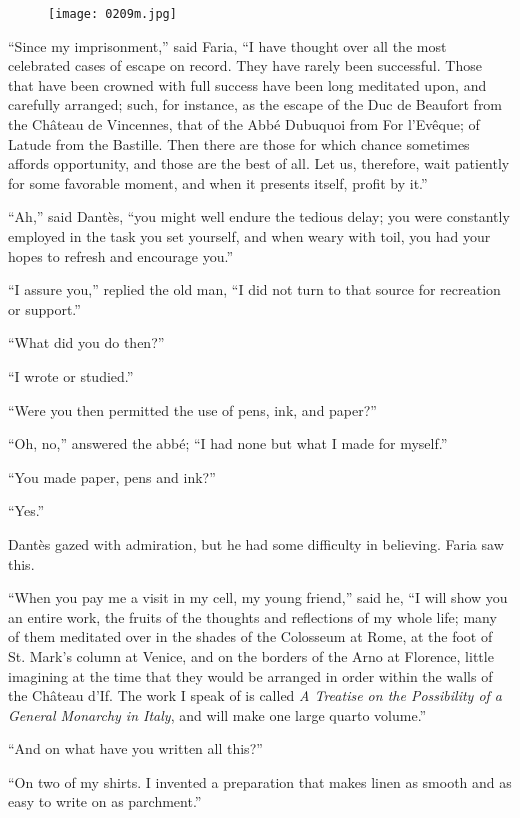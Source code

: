 \begin{figure}[h]
\texttt{[image: 0209m.jpg]}
\end{figure}

“Since my imprisonment,” said Faria, “I have thought over all the most
celebrated cases of escape on record. They have rarely been successful.
Those that have been crowned with full success have been long meditated
upon, and carefully arranged; such, for instance, as the escape of the
Duc de Beaufort from the Château de Vincennes, that of the Abbé
Dubuquoi from For l’Evêque; of Latude from the Bastille. Then there are
those for which chance sometimes affords opportunity, and those are the
best of all. Let us, therefore, wait patiently for some favorable
moment, and when it presents itself, profit by it.”

“Ah,” said Dantès, “you might well endure the tedious delay; you were
constantly employed in the task you set yourself, and when weary with
toil, you had your hopes to refresh and encourage you.”

“I assure you,” replied the old man, “I did not turn to that source for
recreation or support.”

“What did you do then?”

“I wrote or studied.”

“Were you then permitted the use of pens, ink, and paper?”

“Oh, no,” answered the abbé; “I had none but what I made for myself.”

“You made paper, pens and ink?”

“Yes.”

Dantès gazed with admiration, but he had some difficulty in believing.
Faria saw this.

“When you pay me a visit in my cell, my young friend,” said he, “I will
show you an entire work, the fruits of the thoughts and reflections of
my whole life; many of them meditated over in the shades of the
Colosseum at Rome, at the foot of St. Mark’s column at Venice, and on
the borders of the Arno at Florence, little imagining at the time that
they would be arranged in order within the walls of the Château d’If.
The work I speak of is called \textit{A Treatise on the Possibility of a
General Monarchy in Italy}, and will make one large quarto volume.”

“And on what have you written all this?”

“On two of my shirts. I invented a preparation that makes linen as
smooth and as easy to write on as parchment.”

